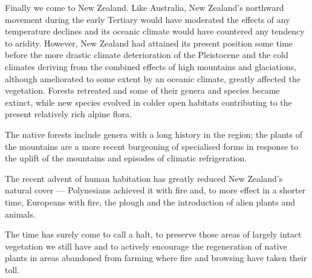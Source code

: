 Finally we come to New Zealand.
Like Australia, New Zealand's northward movement during the early Tertiary would have moderated the effects of any temperature declines and its oceanic climate would have countered any tendency to aridity.
However, New Zealand had attained its present position some time before the more drastic climate deterioration of the Pleistocene and the cold climates deriving from the combined effects of high mountains and glaciations, although ameliorated to some extent by an oceanic climate, greatly affected the vegetation.
Forests retreated and some of their genera and species became extinct, while new species evolved in colder open habitats contributing to the present relatively rich alpine flora.

The native forests include genera with a long history in the region; the plants of the mountains are a more recent burgeoning of specialised forms in response to the uplift of the mountains and episodes of climatic refrigeration.

The recent advent of human habitation has greatly reduced New Zealand's natural cover --- Polynesians achieved it with fire and, to more effect in a shorter time, Europeans with fire, the plough and the introduction of alien plants and animals.

The time has surely come to call a halt, to preserve those areas of largely intact vegetation we still have and to actively encourage the regeneration of native plants in areas abandoned from farming where fire and browsing have taken their toll.
